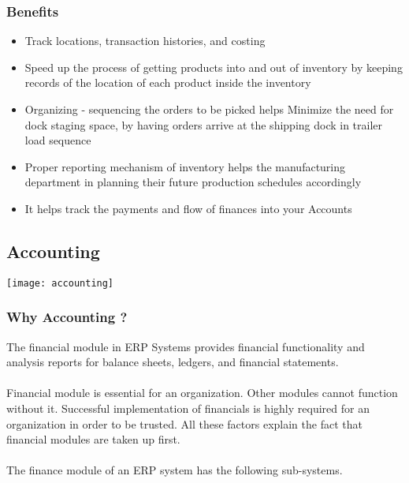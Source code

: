\subsubsection{Benefits}
\begin{itemize}
    \item Track locations, transaction histories, and costing
    \item Speed up the process of getting products into and out of inventory by keeping records of the
    location of each product inside the inventory
    \item Organizing - sequencing the orders to be picked helps Minimize the need for dock staging
    space, by having orders arrive at the shipping dock in trailer load sequence
    \item Proper reporting mechanism of inventory helps the manufacturing department in planning
    their future production schedules accordingly
    \item It helps track the payments and flow of finances into your Accounts
\end{itemize}
\newpage


\subsection{Accounting}
\begin{center}
    \texttt{[image: accounting]}
\end{center}
\subsubsection{Why Accounting ?}
The financial module in ERP Systems provides financial functionality and analysis reports for balance
sheets, ledgers, and financial statements.\\\\
Financial module is essential for an organization. Other modules cannot function without it.
Successful implementation of financials is highly required for an organization in order to be trusted.
All these factors explain the fact that financial modules are taken up first.\\\\
The finance module of an ERP system has the following sub-systems.
